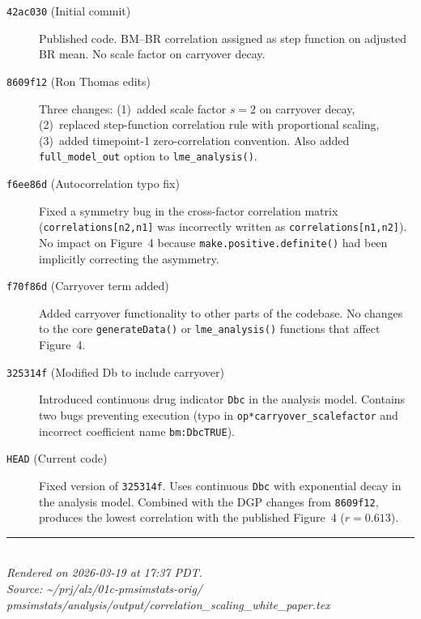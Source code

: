 \documentclass[11pt]{article}
\begin{document}
\begin{description}
\item[\texttt{42ac030} (Initial commit)]
  Published code. BM--BR correlation assigned as step
  function on adjusted BR mean. No scale factor on
  carryover decay.

\item[\texttt{8609f12} (Ron Thomas edits)]
  Three changes: (1)~added scale factor $s = 2$ on
  carryover decay, (2)~replaced step-function correlation
  rule with proportional scaling, (3)~added timepoint-1
  zero-correlation convention. Also added
  \texttt{full\_model\_out} option to
  \texttt{lme\_analysis()}.

\item[\texttt{f6ee86d} (Autocorrelation typo fix)]
  Fixed a symmetry bug in the cross-factor correlation
  matrix (\texttt{correlations[n2,n1]} was incorrectly
  written as \texttt{correlations[n1,n2]}). No impact on
  Figure~4 because \texttt{make.positive.definite()} had
  been implicitly correcting the asymmetry.

\item[\texttt{f70f86d} (Carryover term added)]
  Added carryover functionality to other parts of the
  codebase. No changes to the core \texttt{generateData()}
  or \texttt{lme\_analysis()} functions that affect
  Figure~4.

\item[\texttt{325314f} (Modified Db to include carryover)]
  Introduced continuous drug indicator \texttt{Dbc} in the
  analysis model. Contains two bugs preventing execution
  (typo in \texttt{op*carryover\_scalefactor} and incorrect
  coefficient name \texttt{bm:DbcTRUE}).

\item[\texttt{HEAD} (Current code)]
  Fixed version of \texttt{325314f}. Uses continuous
  \texttt{Dbc} with exponential decay in the analysis
  model. Combined with the DGP changes from
  \texttt{8609f12}, produces the lowest correlation with
  the published Figure~4 ($r = 0.613$).
\end{description}

\vfill
\noindent\rule{\textwidth}{0.4pt}\\
{\small\textit{Rendered on 2026-03-19 at 17:37 PDT.}\\
\textit{Source: \textasciitilde/prj/alz/01c-pmsimstats-orig/%
pmsimstats/analysis/output/correlation\_scaling\_white\_paper.tex}}
\end{document}

